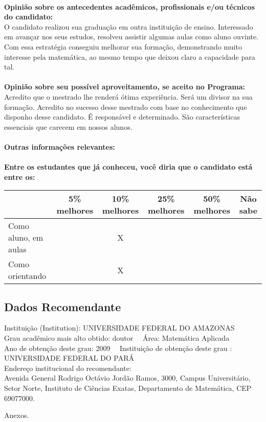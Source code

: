 \documentclass[11pt]{article}
\begin{document}
\\
\textbf{Opinião sobre os antecedentes acadêmicos, profissionais e/ou técnicos do candidato:}
\\O candidato realizou sua graduação em outra instituição de ensino. Interessado em avançar nos seus estudos, resolveu assistir algumas aulas como aluno ouvinte. Com essa estratégia conseguiu melhorar sua formação, demonstrando muito interesse pela matemática, ao mesmo tempo que deixou claro a capacidade para tal.\\
\\
\textbf{Opinião sobre seu possível aproveitamento, se aceito no Programa:}
\\Acredito que o mestrado lhe renderá ótima experiência. Será um divisor na sua formação. Acredito no sucesso desse mestrado com base no conhecimento que disponho desse candidato. É responsável e determinado. São características essenciais que carecem em nossos alunos.\\ 
\\
\textbf{Outras informações relevantes:} \\
\\[0.3cm]
\textbf{Entre os estudantes que já conheceu, você diria que o candidato está entre os:}
\\
\begin{tabular}{|l|c|c|c|c|c|}
\hline
 & 5\% melhores & 10\% melhores & 25\% melhores & 50\% melhores & Não sabe \\
\hline
Como aluno, em aulas &  & X &  &  & \\
\hline
Como orientando &  & X &  &  & \\
\hline
\end{tabular}
\subsection*{Dados Recomendante} 
	Instituição (Institution): UNIVERSIDADE FEDERAL DO AMAZONAS
\\ 
	Grau acadêmico mais alto obtido: doutor
	\ \ Área: Matemática Aplicada
	\\
	Ano de obtenção deste grau: 2009
	\ \ 
	Instituição de obtenção deste grau : UNIVERSIDADE FEDERAL DO PARÁ
	\\ 
	Endereço institucional do recomendante: \\ Avenida General Rodrigo Octávio Jordão Ramos, 3000, Campus Universitário, Setor Norte, Instituto de Ciências Exatas, Departamento de Matemática, CEP 69077000. 
\begin{center}
Anexos.
\end{center}
\end{document}
